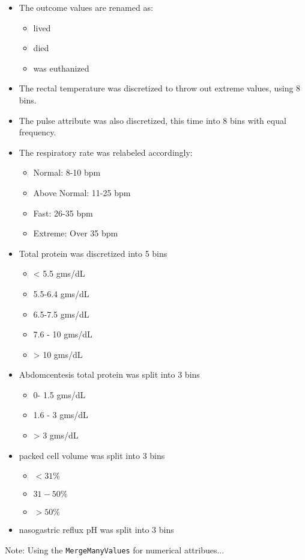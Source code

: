 \begin{itemize}
\item The outcome values are renamed as:
\begin{itemize}
\item lived
\item died
\item was euthanized
\end{itemize}

\item The rectal temperature was discretized to throw out extreme values, using 8 bins.

\item The pulse attribute was also discretized, this time into 8 bins with equal frequency.

\item The respiratory rate was relabeled accordingly:
\begin{itemize}
\item Normal: 8-10 bpm
\item Above Normal: 11-25 bpm
\item Fast: 26-35 bpm
\item Extreme: Over 35 bpm
\end{itemize}

\item Total protein was discretized into 5 bins
\begin{itemize}
\item < 5.5 gms/dL
\item 5.5-6.4 gms/dL
\item 6.5-7.5 gms/dL
\item 7.6 - 10 gms/dL
\item > 10 gms/dL
\end{itemize}


\item Abdomcentesis total protein was split into 3 bins
\begin{itemize}
\item 0- 1.5 gms/dL
\item 1.6 - 3 gms/dL
\item > 3 gms/dL
\end{itemize}

\item packed cell volume was split into 3 bins
\begin{itemize}
\item $< 31 \%$
\item $31-50 \%$
\item $> 50 \%$
\end{itemize}

\item nasogastric reflux pH was split into 3 bins


\end{itemize}

Note: Using the \verb|MergeManyValues| for numerical attribues...
